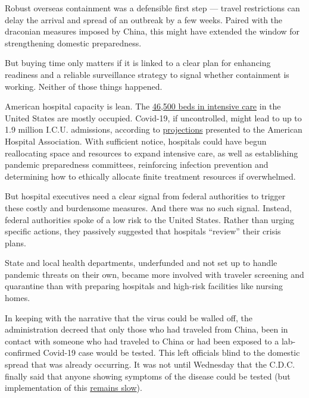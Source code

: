 Robust overseas containment was a defensible first step --- travel
restrictions can delay the arrival and spread of an outbreak by a few
weeks. Paired with the draconian measures imposed by China, this might
have extended the window for strengthening domestic preparedness.

But buying time only matters if it is linked to a clear plan for
enhancing readiness and a reliable surveillance strategy to signal
whether containment is working. Neither of those things happened.

American hospital capacity is lean. The
\href{http://www.centerforhealthsecurity.org/cbn/2020/cbnreport-02272020.html}{46,500
beds in intensive care} in the United States are mostly occupied.
Covid-19, if uncontrolled, might lead to up to 1.9 million I.C.U.
admissions, according to
\href{https://www.businessinsider.com/presentation-us-hospitals-preparing-for-millions-of-hospitalizations-2020-3}{projections}
presented to the American Hospital Association. With sufficient notice,
hospitals could have begun reallocating space and resources to expand
intensive care, as well as establishing pandemic preparedness
committees, reinforcing infection prevention and determining how to
ethically allocate finite treatment resources if overwhelmed.

But hospital executives need a clear signal from federal authorities to
trigger these costly and burdensome measures. And there was no such
signal. Instead, federal authorities spoke of a low risk to the United
States. Rather than urging specific actions, they passively suggested
that hospitals ``review'' their crisis plans.

State and local health departments, underfunded and not set up to handle
pandemic threats on their own, became more involved with traveler
screening and quarantine than with preparing hospitals and high-risk
facilities like nursing homes.

In keeping with the narrative that the virus could be walled off, the
administration decreed that only those who had traveled from China, been
in contact with someone who had traveled to China or had been exposed to
a lab-confirmed Covid-19 case would be tested. This left officials blind
to the domestic spread that was already occurring. It was not until
Wednesday that the C.D.C. finally said that anyone showing symptoms of
the disease could be tested (but implementation of this
\href{https://thehill.com/changing-america/well-being/prevention-cures/486198-pence-currently-not-enough-coronavirus-tests-to}{remains
slow}).

